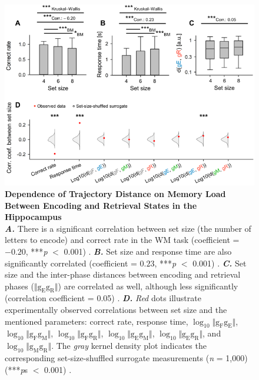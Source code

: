 \documentclass[final,3p,times,twocolumn]{elsarticle}
\begin{document}
        \begin{figure}[ht]
        	\centering
            \includegraphics[width=1\textwidth]{./src/figures/.png/Figure_ID_03.png}
        	\caption{\textbf{
Dependence of Trajectory Distance on Memory Load Between Encoding and Retrieval States in the Hippocampus 
}
\smallskip
\\
\textbf{\textit{A.}} There is a significant correlation between set size (the number of letters to encode) and correct rate in the WM task (coefficient = $-0.20$, ***\textit{p} $<$ 0.001) \cite{van_vugt_hippocampal_2010, li_functional_2023, borders_hippocampus_2022}. \textbf{\textit{B.}} Set size and response time are also significantly correlated (coefficient = $0.23$, ***\textit{p} $<$ 0.001) \cite{dimakopoulos_information_2022}.  \textbf{\textit{C.}} Set size and the inter-phase distances between encoding and retrieval phases ($\Vert \mathrm{g_{E}g_{R}} \Vert$) are correlated as well, although less significantly (correlation coefficient = 0.05) \cite{li_functional_2023}. \textbf{\textit{D.}} \textit{Red} dots illustrate experimentally observed correlations between set size and the mentioned parameters: correct rate, response time, $\log_{10}{\Vert \mathrm{g_{F}g_{E}} \Vert}$, $\log_{10}{\Vert \mathrm{g_{F}g_{M}} \Vert}$, $\log_{10}{\Vert \mathrm{g_{F}g_{R}} \Vert}$, $\log_{10}{\Vert \mathrm{g_{E}g_{M}} \Vert}$, $\log_{10}{\Vert \mathrm{g_{E}g_{R}} \Vert}$, and $\log_{10}{\Vert \mathrm{g_{M}g_{R}} \Vert}$. The \textit{gray} kernel density plot indicates the corresponding set-size-shuffled surrogate measurements (\textit{n} = 1,000) (***\textit{p}s $<$ 0.001) \cite{norimoto_hippocampal_2018, hajos_input-output_2013}.
}
        	\label{fig:03}
        \end{figure}
\end{document}

